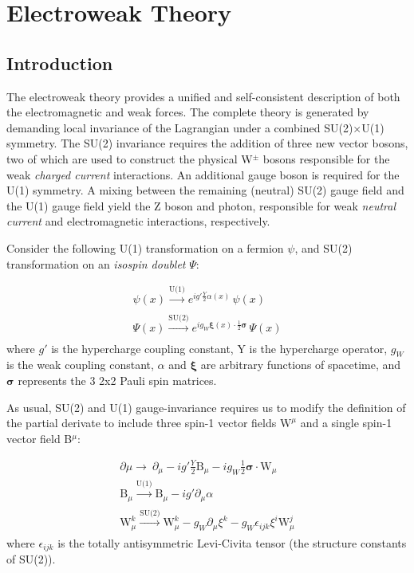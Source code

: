 \section{Electroweak Theory} 

\subsection{Introduction}

The electroweak theory provides a unified and self-consistent description of both the electromagnetic and weak forces. The complete theory is generated by demanding local invariance of the Lagrangian under a combined SU(2)$\times$U(1) symmetry. The SU(2) invariance requires the addition of three new vector bosons, two of which are used to construct the physical W$^{\pm}$ bosons responsible for the weak \textit{charged current} interactions. An additional gauge boson is required for the U(1) symmetry. A mixing between the remaining (neutral) SU(2) gauge field and the U(1) gauge field yield the Z boson and photon, responsible for weak \textit{neutral current} and electromagnetic interactions, respectively. 

Consider the following U(1) transformation on a fermion $\psi$, and SU(2) transformation on an \textit{isospin doublet} $\Psi$:

\begin{equation}
\begin{array}{l}
\psi(x) \xrightarrow[]{\text{U(1)}} e^{i g' \frac{Y}{2} \alpha(x)} \, \psi(x) \\
\Psi(x) \xrightarrow[]{\text{SU(2)}} e^{i g_{W} \bm{\xi}(x) \cdot \frac{1}{2} \bm{\sigma} } \, \Psi(x) 
\end{array}
\end{equation}
where $g'$ is the hypercharge coupling constant, Y is the hypercharge operator, $g_{W}$ is the weak coupling constant, $\alpha$ and $\bm{\xi}$ are arbitrary functions of spacetime, and $\bm{\sigma}$ represents the 3 2x2 Pauli spin matrices.

As usual, SU(2) and U(1) gauge-invariance requires us to modify the definition of the partial derivate to include three spin-1 vector fields $\bm{\mathrm{W}}^{\mu}$ and a single spin-1 vector field B$^{\mu}$:

\begin{equation}
\begin{array}{l}
\partial{\mu} \rightarrow\ \partial_{\mu} - i g' \frac{Y}{2}\mathrm{B}_{\mu} -  i g_{W} \frac{1}{2}\bm{\sigma} \cdot \bm{\mathrm{W}}_{\mu}\\
\mathrm{B}_{\mu} \xrightarrow[]{\text{U(1)}} \mathrm{B}_{\mu} - i g' \partial_{\mu} \alpha \\
\mathrm{W}^{k}_{\mu} \xrightarrow[]{\text{SU(2)}} \mathrm{W}^{k}_{\mu} - g_{W} \partial_{\mu} \xi^{k} -  g_{W} \epsilon_{ijk} \xi^{i} \mathrm{W}^{j}_{\mu}
 \end{array}
\end{equation}
where $\epsilon_{ijk}$ is the totally antisymmetric Levi-Civita tensor (the structure constants of SU(2)).

